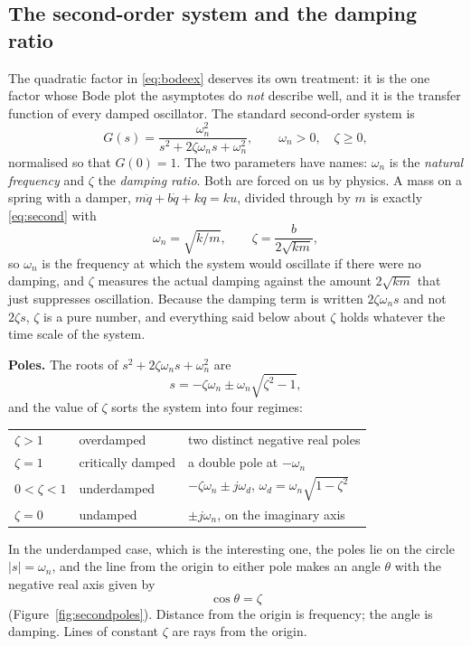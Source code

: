 \documentclass[11pt]{article}
\begin{document}
\subsection{The second-order system and the damping ratio}\label{sec:second}
The quadratic factor in \eqref{eq:bodeex} deserves its own treatment: it is the one
factor whose Bode plot the asymptotes do \emph{not} describe well, and it is the
transfer function of every damped oscillator. The standard second-order system is
\begin{equation}\label{eq:second}
   G(s) = \frac{\omega_n^{2}}{s^{2}+2\zeta\omega_n s+\omega_n^{2}},
   \qquad \omega_n>0,\quad \zeta\ge 0,
\end{equation}
normalised so that $G(0)=1$. The two parameters have names: $\omega_n$ is the
\emph{natural frequency} and $\zeta$ the \emph{damping ratio}. Both are forced on
us by physics. A mass on a spring with a damper, $m\ddot q+b\dot q+kq=ku$, divided
through by $m$ is exactly \eqref{eq:second} with
\begin{equation}\label{eq:zetawn}
   \omega_n = \sqrt{k/m},\qquad
   \zeta = \frac{b}{2\sqrt{km}} ,
\end{equation}
so $\omega_n$ is the frequency at which the system would oscillate if there were no
damping, and $\zeta$ measures the actual damping against the amount $2\sqrt{km}$
that just suppresses oscillation. Because the damping term is written
$2\zeta\omega_n s$ and not $2\zeta s$, $\zeta$ is a pure number, and everything
said below about $\zeta$ holds whatever the time scale of the system.

\smallskip\noindent\textbf{Poles.} The roots of $s^{2}+2\zeta\omega_n s+\omega_n^{2}$ are
\[
   s = -\zeta\omega_n \pm \omega_n\sqrt{\zeta^{2}-1},
\]
and the value of $\zeta$ sorts the system into four regimes:
\begin{center}\small
\renewcommand{\arraystretch}{1.3}
\begin{tabular}{@{}lll@{}}
\toprule
$\zeta>1$   & overdamped        & two distinct negative real poles\\
$\zeta=1$   & critically damped & a double pole at $-\omega_n$\\
$0<\zeta<1$ & underdamped       & $-\zeta\omega_n\pm j\omega_d$, \quad $\omega_d=\omega_n\sqrt{1-\zeta^{2}}$\\
$\zeta=0$   & undamped          & $\pm j\omega_n$, on the imaginary axis\\
\bottomrule
\end{tabular}
\end{center}
In the underdamped case, which is the interesting one, the poles lie on the circle
$|s|=\omega_n$, and the line from the origin to either pole makes an angle
$\theta$ with the negative real axis given by
\begin{equation}\label{eq:zetaangle}
   \cos\theta = \zeta
\end{equation}
(Figure~\ref{fig:secondpoles}). Distance from the origin is frequency; the angle is
damping. Lines of constant $\zeta$ are rays from the origin.
\end{document}
